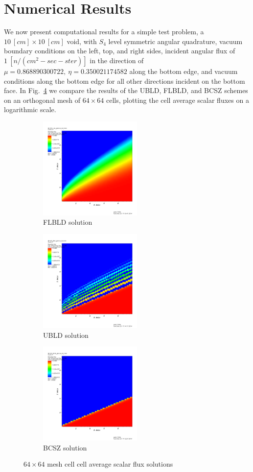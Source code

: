 \documentclass{mc2015}
\newcommand{\fig}[1]{Fig.~\ref{#1}}                      %
\begin{document}
\section{Numerical Results}
\label{sec:results}
We now present computational results for a simple test problem, a $10~[cm] \times 10~[cm]$ void, with $S_4$ level symmetric angular quadrature,
 vacuum boundary conditions on the left, top, and right sides, incident angular flux of $1~[n/(cm^2-sec-ster)]$ in the direction of $\mu=0.868890300722,~\eta = 0.350021174582$ along the bottom edge, and vacuum conditions along the bottom edge for all other directions incident on the bottom face.
In \fig{fig:negatives} we compare the results of the UBLD, FLBLD, and BCSZ schemes on an orthogonal mesh of $64\times 64$ cells, plotting the cell average scalar fluxes on a logarithmic scale.
\begin{figure}[h]
	\begin{center}
		\begin{subfigure}{0.3\textwidth}
			\includegraphics[width=2in]{cb_64.png}
			\caption{FLBLD solution}
			\label{fig:scb_64}		
		\end{subfigure}
		\begin{subfigure}{0.3\textwidth}
			\includegraphics[width=2in]{bild_64.png}
			\caption{UBLD solution}
			\label{fig:bild_64}		
		\end{subfigure}
		\begin{subfigure}{0.3\textwidth}
			\includegraphics[width=2in]{bcsz_64.png}
			\caption{BCSZ solution}
			\label{fig:bcsz_64}		
		\end{subfigure}
	\end{center}
	\caption{$64\times 64$ mesh cell cell average scalar flux solutions}
	\label{fig:negatives}
\end{figure}
\end{document}
